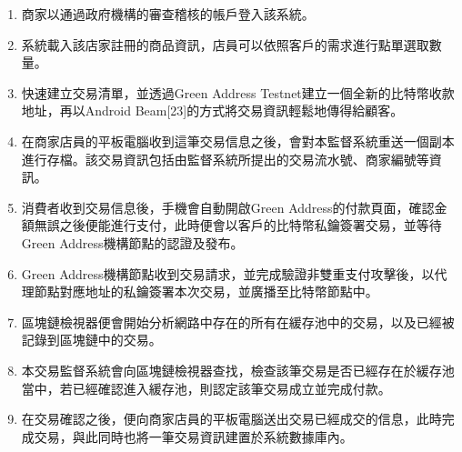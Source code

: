 	\begin{enumerate}
		\item 商家以通過政府機構的審查稽核的帳戶登入該系統。
		\item 系統載入該店家註冊的商品資訊，店員可以依照客戶的需求進行點單選取數量。
		\item 快速建立交易清單，並透過Green Address Testnet建立一個全新的比特幣收款地址，再以Android Beam[23]的方式將交易資訊輕鬆地傳得給顧客。
		\item 在商家店員的平板電腦收到這筆交易信息之後，會對本監督系統重送一個副本進行存檔。該交易資訊包括由監督系統所提出的交易流水號、商家編號等資訊。
		\item 消費者收到交易信息後，手機會自動開啟Green Address的付款頁面，確認金額無誤之後便能進行支付，此時便會以客戶的比特幣私鑰簽署交易，並等待Green Address機構節點的認證及發布。
		\item Green Address機構節點收到交易請求，並完成驗證非雙重支付攻擊後，以代理節點對應地址的私鑰簽署本次交易，並廣播至比特幣節點中。
		\item 區塊鏈檢視器便會開始分析網路中存在的所有在緩存池中的交易，以及已經被記錄到區塊鏈中的交易。
		\item 本交易監督系統會向區塊鏈檢視器查找，檢查該筆交易是否已經存在於緩存池當中，若已經確認進入緩存池，則認定該筆交易成立並完成付款。
		\item 在交易確認之後，便向商家店員的平板電腦送出交易已經成交的信息，此時完成交易，與此同時也將一筆交易資訊建置於系統數據庫內。
	\end{enumerate}